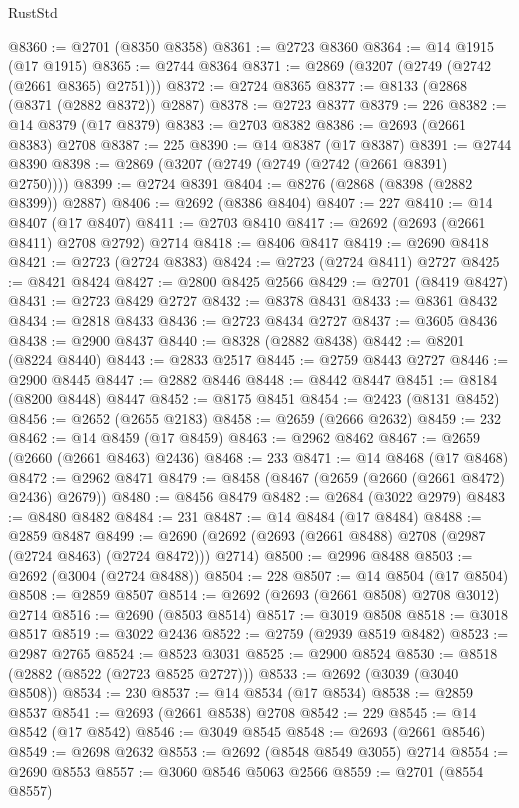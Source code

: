 \begin{lexlean}{RustStd}
\begin{coremodule}
{\begin{coremodule}
{{{{{{{{{{{{{{{{{{{{{{{{{{{{{{{{{{{{{{{@8360 := @2701 (@8350 @8358)
@8361 := @2723 @8360
@8364 := @14 @1915 (@17 @1915)
@8365 := @2744 @8364
@8371 := @2869 (@3207 (@2749 (@2742 (@2661 @8365) @2751)))
@8372 := @2724 @8365
@8377 := @8133 (@2868 (@8371 (@2882 @8372)) @2887)
@8378 := @2723 @8377
@8379 := 226
@8382 := @14 @8379 (@17 @8379)
@8383 := @2703 @8382
@8386 := @2693 (@2661 @8383) @2708
@8387 := 225
@8390 := @14 @8387 (@17 @8387)
@8391 := @2744 @8390
@8398 := @2869 (@3207 (@2749 (@2749 (@2742 (@2661 @8391) @2750))))
@8399 := @2724 @8391
@8404 := @8276 (@2868 (@8398 (@2882 @8399)) @2887)
@8406 := @2692 (@8386 @8404)
@8407 := 227
@8410 := @14 @8407 (@17 @8407)
@8411 := @2703 @8410
@8417 := @2692 (@2693 (@2661 @8411) @2708 @2792) @2714
@8418 := @8406 @8417
@8419 := @2690 @8418
@8421 := @2723 (@2724 @8383)
@8424 := @2723 (@2724 @8411) @2727
@8425 := @8421 @8424
@8427 := @2800 @8425 @2566
@8429 := @2701 (@8419 @8427)
@8431 := @2723 @8429 @2727
@8432 := @8378 @8431
@8433 := @8361 @8432
@8434 := @2818 @8433
@8436 := @2723 @8434 @2727
@8437 := @3605 @8436
@8438 := @2900 @8437
@8440 := @8328 (@2882 @8438)
@8442 := @8201 (@8224 @8440)
@8443 := @2833 @2517
@8445 := @2759 @8443 @2727
@8446 := @2900 @8445
@8447 := @2882 @8446
@8448 := @8442 @8447
@8451 := @8184 (@8200 @8448) @8447
@8452 := @8175 @8451
@8454 := @2423 (@8131 @8452)
@8456 := @2652 (@2655 @2183)
@8458 := @2659 (@2666 @2632)
@8459 := 232
@8462 := @14 @8459 (@17 @8459)
@8463 := @2962 @8462
@8467 := @2659 (@2660 (@2661 @8463) @2436)
@8468 := 233
@8471 := @14 @8468 (@17 @8468)
@8472 := @2962 @8471
@8479 := @8458 (@8467 (@2659 (@2660 (@2661 @8472) @2436) @2679))
@8480 := @8456 @8479
@8482 := @2684 (@3022 @2979)
@8483 := @8480 @8482
@8484 := 231
@8487 := @14 @8484 (@17 @8484)
@8488 := @2859 @8487
@8499 := @2690 (@2692 (@2693 (@2661 @8488) @2708 (@2987 (@2724 @8463) (@2724 @8472))) @2714)
@8500 := @2996 @8488
@8503 := @2692 (@3004 (@2724 @8488))
@8504 := 228
@8507 := @14 @8504 (@17 @8504)
@8508 := @2859 @8507
@8514 := @2692 (@2693 (@2661 @8508) @2708 @3012) @2714
@8516 := @2690 (@8503 @8514)
@8517 := @3019 @8508
@8518 := @3018 @8517
@8519 := @3022 @2436
@8522 := @2759 (@2939 @8519 @8482)
@8523 := @2987 @2765
@8524 := @8523 @3031
@8525 := @2900 @8524
@8530 := @8518 (@2882 (@8522 (@2723 @8525 @2727)))
@8533 := @2692 (@3039 (@3040 @8508))
@8534 := 230
@8537 := @14 @8534 (@17 @8534)
@8538 := @2859 @8537
@8541 := @2693 (@2661 @8538) @2708
@8542 := 229
@8545 := @14 @8542 (@17 @8542)
@8546 := @3049 @8545
@8548 := @2693 (@2661 @8546)
@8549 := @2698 @2632
@8553 := @2692 (@8548 @8549 @3055) @2714
@8554 := @2690 @8553
@8557 := @3060 @8546 @5063 @2566
@8559 := @2701 (@8554 @8557)
}}}}}}}}}}}}}}}}}}}}}}}}}}}}}}}}}}}}}}}
\end{coremodule}}
\end{coremodule}
\end{lexlean}
